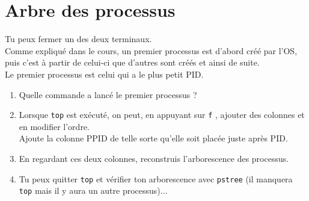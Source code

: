 \documentclass[12pt,a4paper,article,english,firamath]{nsi}
\begin{document}
\section*{Arbre des processus}
Tu peux fermer un des deux terminaux.\\

Comme expliqué dans le cours, un premier processus est d'abord créé par l'OS, puis c'est à partir de celui-ci que d'autres sont créés et ainsi de suite.\\
Le premier processus est celui qui a le plus petit PID.\\
\begin{enumerate}
    \item 	Quelle commande a lancé le premier processus ?
    \item 	Lorsque \texttt{top} est exécuté, on peut, en appuyant sur \texttt{f} , ajouter des colonnes et en modifier l'ordre.\\
          Ajoute la colonne PPID de telle sorte qu'elle soit placée juste après PID.
    \item 	En regardant ces deux colonnes, reconstruis l'arborescence des processus.
    \item 	Tu peux quitter \texttt{top} et vérifier ton arborescence avec \texttt{pstree} (il manquera \texttt{top} mais il y aura un autre processus)...
\end{enumerate}
\end{document}
